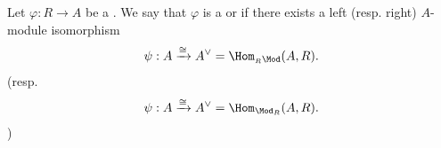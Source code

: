 \begin{definition} \label{definition:left_right_frobenius_self_dual_ring_homomorphism}
    Let $\varphi: R \to A$ be a . 
    We say that $\varphi$ is a  or  if there exists a left (resp. right) $A$-module isomorphism
    $$\psi: A \xrightarrow{\cong} A^\vee = \Hom_{{}_R \Mod}(A,R).$$
    (resp.
    $$\psi: A \xrightarrow{\cong} A^\vee = \Hom_{\Mod_{R}}(A,R).$$
    )
\end{definition}